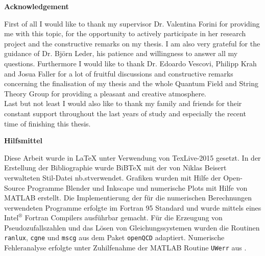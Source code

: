 \begin{center}
{\sffamily \bfseries\Large Acknowledgement}\\
\end{center}%
\vspace{1cm}
%
First of all I would like to thank my supervisor Dr. Valentina Forini for providing me with this topic, for the opportunity to actively participate in her research project and the constructive remarks on my thesis. I am also very grateful for the guidance of Dr. Björn Leder, his patience and willingness to answer all my questions. Furthermore I would like to thank Dr. Edoardo Vescovi, Philipp Krah and Josua Faller for a lot of fruitful discussions and constructive remarks concerning the finalisation of my thesis and the whole Quantum Field and String Theory Group for providing a pleasant and creative atmosphere.\\
Last but not least I would also like to thank my family and friends for their constant support throughout the last years of study and especially the recent time of finishing this thesis.\\
%
%
%
\vspace{3cm}
%
\begin{center}
{\sffamily \bfseries\Large Hilfsmittel}\\
\end{center}%
\vspace{1cm}
Diese Arbeit wurde in \LaTeX{ } unter Verwendung von TexLive-2015 gesetzt. In der Erstellung der Bibliographie wurde BiBTeX mit der von Niklas Beisert verwalteten Stil-Datei \glqq nb.st\grqq{ }verwendet. Grafiken wurden mit Hilfe der Open-Source Programme Blender und Inkscape und numerische Plots mit Hilfe von MATLAB erstellt. Die Implementierung der für die numerischen Berechnungen verwendeten Programme erfolgte im {\sc Fortran 95} Standard und wurde mittels eines $\text{Intel}^{\circledR}$ Fortran Compilers ausführbar gemacht. Für die Erzeugung von Pseudozufallszahlen und das Lösen von Gleichungssystemen wurden die Routinen \texttt{ranlux}, \texttt{cgne} und \texttt{mscg} aus dem Paket \texttt{openQCD} adaptiert. Numerische Fehleranalyse erfolgte unter Zuhilfenahme der MATLAB Routine \texttt{UWerr} aus \cite{Wolff:2003sm}.